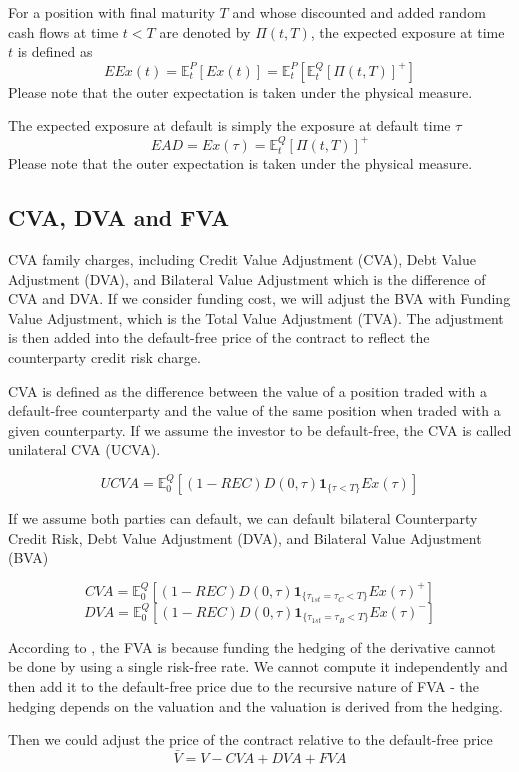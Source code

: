 \begin{definition}
For a position with final maturity $T$ and whose discounted and added random cash flows at time $t < T$ are denoted by $\Pi(t,T)$, the expected exposure at time $t$ is defined as
$$ EEx(t)= \mathbb{E}_t^P[Ex(t)]=\mathbb{E}_t^P[\mathbb{E}_t^Q[\Pi(t,T)]^+] $$
Please note that the outer expectation is taken under the physical measure.
\end{definition}


\begin{definition}
The expected exposure at default is simply the exposure at default time $\tau$
$$ EAD = Ex(\tau)= \mathbb{E}_t^Q[\Pi(t,T)]^+ $$
Please note that the outer expectation is taken under the physical measure.
\end{definition}

\subsection{CVA, DVA and FVA}

CVA family charges, including Credit Value Adjustment (CVA), Debt Value Adjustment (DVA), and Bilateral Value Adjustment which is the difference of CVA and DVA. If we consider funding cost, we will adjust the BVA with Funding Value Adjustment, which is the Total Value Adjustment (TVA). The adjustment is then added into the default-free price of the contract to reflect the counterparty credit risk charge.

CVA is defined as the difference between the value of a position traded with a default-free counterparty and the value of the same position when traded with a given counterparty. If we assume the investor to be default-free, the CVA is called unilateral CVA (UCVA).

\begin{definition}
$$ UCVA = \mathbb{E}_0^Q[(1-REC)D(0,\tau)\mathbf{1}_{\{\tau<T\}}Ex(\tau)] $$
\end{definition}

If we assume both parties can default, we can default bilateral Counterparty Credit Risk, Debt Value Adjustment (DVA), and Bilateral Value Adjustment (BVA)

\begin{definition}
$$ CVA=\mathbb{E}_0^Q[(1-REC)D(0,\tau)\mathbf{1}_{\{\tau_{1st}=\tau_C<T\}}Ex(\tau)^+] $$
$$ DVA=\mathbb{E}_0^Q[(1-REC)D(0,\tau)\mathbf{1}_{\{\tau_{1st}=\tau_B<T\}}Ex(\tau)^-] $$
\end{definition}

According to \cite{brigobook}, the FVA is because funding the hedging of the derivative cannot be done by using a single risk-free rate. We cannot compute it independently and then add it to the default-free price due to the recursive nature of FVA - the hedging depends on the valuation and the valuation is derived from the hedging. 

Then we could adjust the price of the contract relative to the default-free price
$$ \bar{V} = V-CVA+DVA+FVA $$
